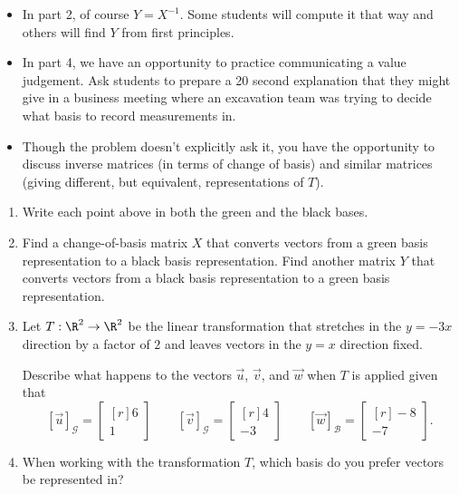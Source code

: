 \documentclass{problemset}
\newcommand{\mat}[1]{\begin{bmatrix*}[r]#1\end{bmatrix*}}
\begin{document}
\begin{iola}
\begin{annotation}
\begin{notes}
			\begin{itemize}
				\item In part 2, of course $Y=X^{-1}$. Some students will
					compute it that way and others will find $Y$ from
					first principles.
				\item In part 4, we have an opportunity to practice communicating
					a value judgement. Ask students to prepare a 20 second explanation
					that they might give in a business meeting where an excavation
					team was trying to decide what basis to record measurements
					in.
				\item Though the problem doesn't explicitly ask it, you have the opportunity
					to discuss inverse matrices (in terms of change of basis) and similar
					matrices (giving different, but equivalent, representations of $T$).
			\end{itemize}
		\end{notes}
	\end{annotation}


\begin{enumerate}
	\item Write each point above in both the green and the black bases.
	\item Find a change-of-basis matrix $X$ that converts vectors from
		a green basis representation to a black basis representation. Find
		another matrix $Y$ that converts vectors from a black basis representation
		to a green basis representation.
	\item Let $T:\R^2\to\R^2$ be the linear transformation that stretches in the $y=-3x$ direction
		by a factor of $2$ and leaves vectors in the $y=x$ direction fixed.

		Describe what happens to the vectors $\vec u$, $\vec v$, and $\vec w$ when
		$T$ is applied given that
		\[
			[\vec u]_{\mathcal G} = \mat{6\\1} \qquad
			[\vec v]_{\mathcal G} = \mat{4\\-3} \qquad
			[\vec w]_{\mathcal B} = \mat{-8\\-7}.
		\]
	\item When working with the transformation $T$, which basis do you prefer vectors be
		represented in?
\end{enumerate}
\end{iola}
\end{document}
